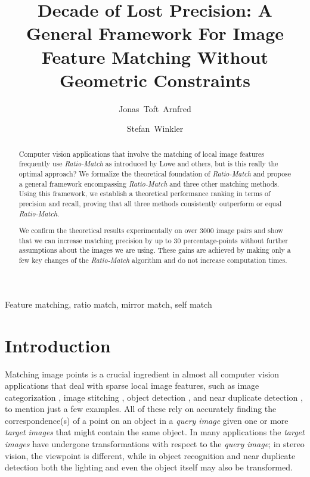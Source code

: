 \documentclass[review]{elsarticle}
\begin{document}
\title{Decade of Lost Precision:
A General Framework For Image Feature Matching Without Geometric Constraints}

\author[adsc]{Jonas~Toft~Arnfred}
\author[adsc]{Stefan~Winkler}

\address[adsc]{Advanced Digital Sciences Center (ADSC), University of Illinois at Urbana-Champaign (UIUC), Singapore}

\begin{abstract}
Computer vision applications that involve the matching of local image features frequently use \emph{Ratio-Match} as introduced by Lowe and others, but is this really the optimal approach?  We formalize the theoretical foundation of \emph{Ratio-Match} and propose a general framework encompassing \emph{Ratio-Match} and three other matching methods. Using this framework, we establish a theoretical performance ranking in terms of precision and recall, proving that all three methods consistently outperform or equal \emph{Ratio-Match}.

We confirm the theoretical results experimentally on over 3000 image pairs and show that we can increase matching precision by up to 30 percentage-points without further assumptions about the images we are using.  These gains are achieved by making only a few key changes of the \emph{Ratio-Match} algorithm and do not increase computation times.
\end{abstract}

\begin{keyword}
Feature matching, ratio match, mirror match, self match
\end{keyword}

\maketitle

\section{Introduction}
%
Matching image points is a crucial ingredient in almost all computer vision applications that deal with sparse local image features, such as image categorization \cite{bosch2008scene}, image stitching \cite{brown2007automatic}, object detection \cite{zhang2007local}, and near duplicate detection \cite{zhao2009scale}, to mention just a few examples.  All of these rely on accurately finding the correspondence(s) of a point on an object in a \emph{query image} given one or more \emph{target images} that might contain the same object.  In many applications the \emph{target images} have undergone transformations with respect to the \emph{query image}; in stereo vision, the viewpoint is different, while in object recognition and near duplicate  detection both the lighting and even the object itself may also be transformed.
\end{document}
